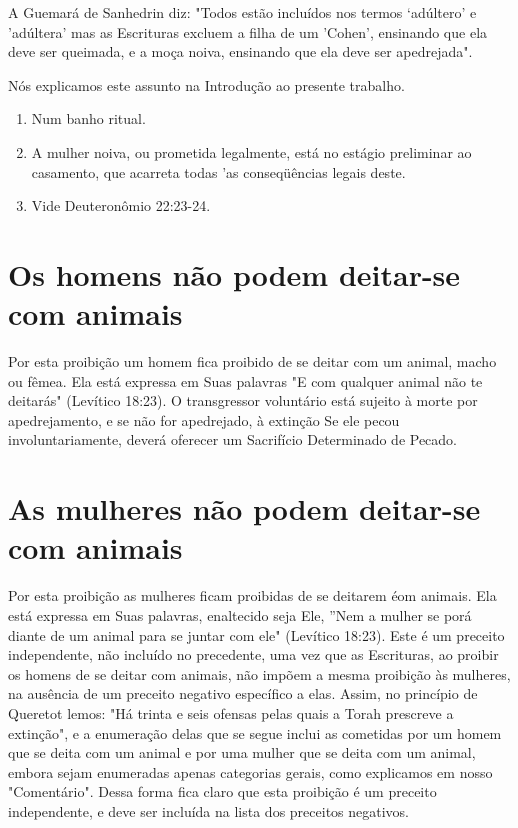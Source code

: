 \begin{itemize}
\begin{enumrate}
\begin{itemize}
\begin{itemize}
\begin{itemize}
A Guemará de Sanhedrin diz: "Todos estão incluídos nos termos `adúltero'
e 'adúltera' mas as Escrituras excluem a filha de um 'Cohen', ensi­nando
que ela deve ser queimada, e a moça noiva, ensinando que ela deve ser
apedrejada".


Nós explicamos este assunto na Introdução ao presente trabalho.

\begin{enumerate}
\def\labelenumi{\arabic{enumi}.}
\setcounter{enumi}{442}
\item
 
 Num banho ritual.
 
\item
 
 A mulher noiva, ou prometida legalmente, está no estágio preliminar ao
 casamento, que acar­reta todas 'as conseqüências legais deste.
 
\item
 
 Vide Deuteronômio 22:23-24.
 
\end{enumerate}



\section{Os homens não podem deitar-se com animais}

Por esta proibição um homem fica proibido de se deitar com um ani­mal,
macho ou fêmea. Ela está expressa em Suas palavras "E com qualquer
ani­mal não te deitarás" (Levítico 18:23). O transgressor voluntário
está sujeito à morte por apedrejamento, e se não for apedrejado, à
extinção Se ele pecou involuntariamente, deverá oferecer um Sacrifício
Determinado de Pecado.

\section{As mulheres não podem deitar-se com animais}

Por esta proibição as mulheres ficam proibidas de se deitarem éom
animais. Ela está expressa em Suas palavras, enaltecido seja Ele, ''Nem
a mulher se porá diante de um animal para se juntar com ele" (Levítico
18:23). Este é um preceito independente, não incluído no precedente, uma
vez que as Escri­turas, ao proibir os homens de se deitar com animais,
não impõem a mesma proibição às mulheres, na ausência de um preceito
negativo específico a elas. Assim, no princípio de Queretot lemos: "Há
trinta e seis ofensas pelas quais a Torah prescreve a extinção", e a
enumeração delas que se segue inclui as co­metidas por um homem que se
deita com um animal e por uma mulher que se deita com um animal, embora
sejam enumeradas apenas categorias gerais, como explicamos em nosso
"Comentário". Dessa forma fica claro que esta proi­bição é um preceito
independente, e deve ser incluída na lista dos preceitos negativos.


\end{itemize}
\end{itemize}
\end{itemize}
\end{enumrate}
\end{itemize}

